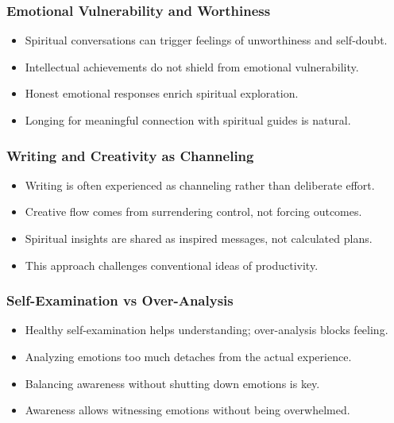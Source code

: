 \begin{frame}[fragile]\frametitle{Emotional Vulnerability and Worthiness}
  \begin{itemize}
    \item Spiritual conversations can trigger feelings of unworthiness and self-doubt.
    \item Intellectual achievements do not shield from emotional vulnerability.
    \item Honest emotional responses enrich spiritual exploration.
    \item Longing for meaningful connection with spiritual guides is natural.
  \end{itemize}
\end{frame}

\begin{frame}[fragile]\frametitle{Writing and Creativity as Channeling}
  \begin{itemize}
    \item Writing is often experienced as channeling rather than deliberate effort.
    \item Creative flow comes from surrendering control, not forcing outcomes.
    \item Spiritual insights are shared as inspired messages, not calculated plans.
    \item This approach challenges conventional ideas of productivity.
  \end{itemize}
\end{frame}

\begin{frame}[fragile]\frametitle{Self-Examination vs Over-Analysis}
  \begin{itemize}
    \item Healthy self-examination helps understanding; over-analysis blocks feeling.
    \item Analyzing emotions too much detaches from the actual experience.
    \item Balancing awareness without shutting down emotions is key.
    \item Awareness allows witnessing emotions without being overwhelmed.
  \end{itemize}
\end{frame}

